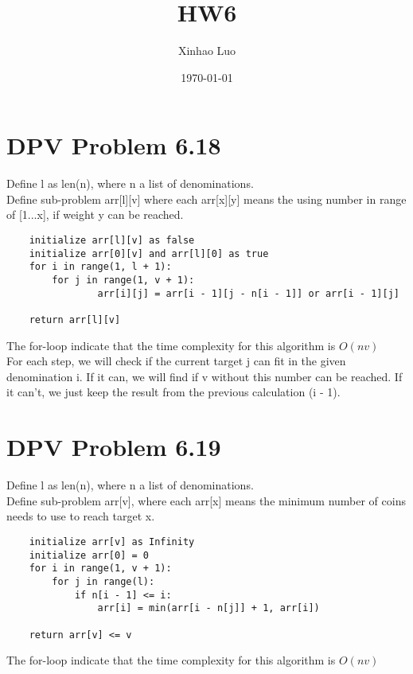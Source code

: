 \documentclass{article}
\title{HW6}
\author{Xinhao Luo}
\date{\today}
\def\math#1{$#1$}
\begin{document}
\maketitle

\section{DPV  Problem 6.18}

Define l as len(n), where n a list of denominations. \\
Define sub-problem arr[l][v] where each arr[x][y] means the using number in range of [1...x], if weight y can be reached.

\begin{verbatim}
    initialize arr[l][v] as false
    initialize arr[0][v] and arr[l][0] as true
    for i in range(1, l + 1):
        for j in range(1, v + 1):
                arr[i][j] = arr[i - 1][j - n[i - 1]] or arr[i - 1][j]

    return arr[l][v]    
\end{verbatim}

The for-loop indicate that the time complexity for this algorithm is \math{O(nv)} \\

For each step, we will check if the current target j can fit in the given denomination i. If it can, we will find if v without this number can be reached. If it can't, we just keep the result from the previous calculation (i - 1).

\section{DPV Problem 6.19}

Define l as len(n), where n a list of denominations. \\
Define sub-problem arr[v], where each arr[x] means the minimum number of coins needs to use to reach target x.

\begin{verbatim}
    initialize arr[v] as Infinity
    initialize arr[0] = 0
    for i in range(1, v + 1):
        for j in range(l):
            if n[i - 1] <= i:
                arr[i] = min(arr[i - n[j]] + 1, arr[i])

    return arr[v] <= v
\end{verbatim}

The for-loop indicate that the time complexity for this algorithm is \math{O(nv)} \\
\end{document}
